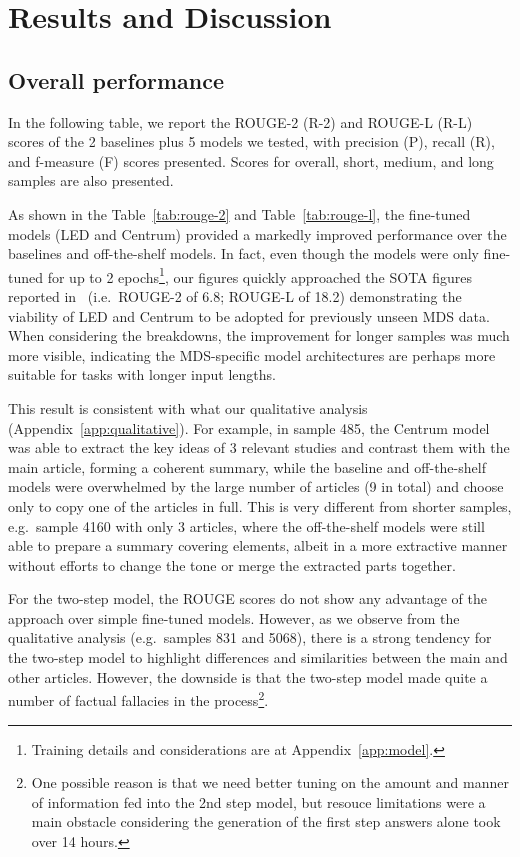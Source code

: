 \documentclass[12pt, twocolumn]{article}
\numberwithin{equation}{section}
\begin{document}
\section{Results and Discussion}
\label{sec:results}

\subsection{Overall performance}
\label{ssec:results-overall}

In the following table, we report the ROUGE-2 (R-2) and ROUGE-L (R-L) scores of the 2 baselines plus 5 models we tested, with precision (P), recall (R), and f-measure (F) scores presented.  Scores for overall, short, medium, and long samples are also presented.

As shown in the Table~\ref{tab:rouge-2} and Table~\ref{tab:rouge-l}, the fine-tuned models (LED and Centrum) provided a markedly improved performance over the baselines and off-the-shelf models.  In fact, even though the models were only fine-tuned for up to 2 epochs\footnote{Training details and considerations are at Appendix~\ref{app:model}.}, our figures quickly approached the SOTA figures reported in~\cite{xiao2022primera} (i.e.~ROUGE-2 of 6.8; ROUGE-L of 18.2) demonstrating the viability of LED and Centrum to be adopted for previously unseen MDS data.  When considering the breakdowns, the improvement for longer samples was much more visible, indicating the MDS-specific model architectures are perhaps more suitable for tasks with longer input lengths.  

This result is consistent with what our qualitative analysis (Appendix~\ref{app:qualitative}).  For example, in sample 485, the Centrum model was able to extract the key ideas of 3 relevant studies and contrast them with the main article, forming a coherent summary, while the baseline and off-the-shelf models were overwhelmed by the large number of articles (9 in total) and choose only to copy one of the articles in full.  This is very different from shorter samples, e.g.~sample 4160 with only 3 articles, where the off-the-shelf models were still able to prepare a summary covering elements, albeit in a more extractive manner without efforts to change the tone or merge the extracted parts together.

For the two-step model, the ROUGE scores do not show any advantage of the approach over simple fine-tuned models.  However, as we observe from the qualitative analysis (e.g.~samples 831 and 5068), there is a strong tendency for the two-step model to highlight differences and similarities between the main and other articles.  However, the downside is that the two-step model made quite a number of factual fallacies in the process\footnote{One possible reason is that we need better tuning on the amount and manner of information fed into the 2nd step model, but resouce limitations were a main obstacle considering the generation of the first step answers alone took over 14 hours.}.
\end{document}
